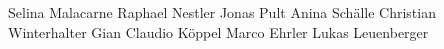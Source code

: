 Selina Malacarne
Raphael Nestler
Jonas Pult
Anina Schälle
Christian Winterhalter
Gian Claudio Köppel
Marco Ehrler
Lukas Leuenberger